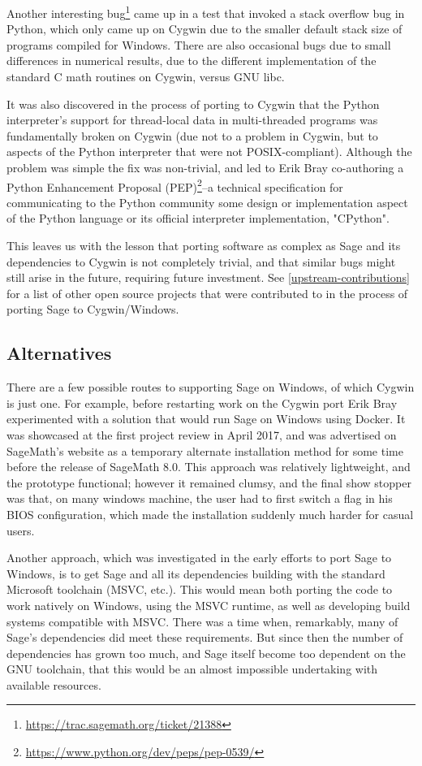 Another interesting bug\footnote{\url{https://trac.sagemath.org/ticket/21388}}
came up in a test that invoked a stack overflow bug in Python, which only came
up on Cygwin due to the smaller default stack size of programs compiled for
Windows.  There are also occasional bugs due to small differences in numerical
results, due to the different implementation of the standard C math routines on
Cygwin, versus GNU libc.

It was also discovered in the process of porting to Cygwin that the Python
interpreter's support for thread-local data in multi-threaded programs was
fundamentally broken on Cygwin (due not to a problem in Cygwin, but to aspects
of the Python interpreter that were not POSIX-compliant).  Although the problem
was simple the fix was non-trivial, and led to Erik Bray co-authoring a Python
Enhancement Proposal
(PEP)\footnote{\url{https://www.python.org/dev/peps/pep-0539/}}--a technical
specification for communicating to the Python community some design or
implementation aspect of the Python language or its official interpreter
implementation, "CPython".

This leaves us with the lesson that porting software as complex as Sage and its
dependencies to Cygwin is not completely trivial, and that similar bugs might
still arise in the future, requiring future investment.  See
\ref{upstream-contributions} for a list of other open source projects that were
contributed to in the process of porting Sage to Cygwin/Windows.


\subsection{Alternatives}\label{alternatives}

There are a few possible routes to supporting Sage on Windows, of which
Cygwin is just one. For example, before restarting work on the Cygwin
port Erik Bray experimented with a solution that would run Sage on
Windows using Docker.
It was showcased at the first project review in
April 2017, and was advertised on SageMath's website as a temporary
alternate installation method for some time before the release of
SageMath 8.0.
This approach was relatively lightweight, and the prototype functional;
however it remained clumsy, and the final show stopper was that, on many
windows machine, the user had to first switch a flag in his BIOS
configuration, which made the installation suddenly much harder for
casual users.

Another approach, which was investigated in the early efforts to port Sage
to Windows, is to get Sage and all its dependencies building with
the standard Microsoft toolchain (MSVC, etc.). This would mean both
porting the code to work natively on Windows, using the MSVC runtime, as
well as developing build systems compatible with MSVC. There was a time
when, remarkably, many of Sage's dependencies did meet these
requirements. But since then the number of dependencies has grown too
much, and Sage itself become too dependent on the GNU toolchain, that
this would be an almost impossible undertaking with available resources.

